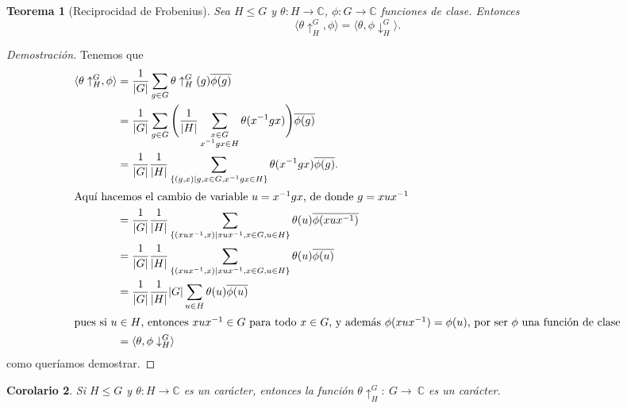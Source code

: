 \documentclass[12pt]{book}
\newtheorem{theorem}{Teorema}[section]
\newtheorem{corollary}[theorem]{Corolario}
\theoremstyle{definition}
\newcounter{in}
\begin{document}
\begin{theorem}[Reciprocidad de Frobenius]
  \label{frobenius}
  Sea $H\leq G$ y $\theta:H\rightarrow\mathbb{C}$,
  $\phi:G\rightarrow \mathbb{C}$ funciones de
  clase. Entonces
  \begin{equation*}
    \langle\theta\uparrow^{G}_{H},\phi\rangle=\langle\theta,\phi\downarrow^{G}_{H}\rangle.
  \end{equation*}
\end{theorem}
\begin{proof}[Demostración]
  Tenemos que 
  \begin{align*}
    \langle\theta\uparrow^{G}_{H},\phi\rangle&=\frac{1}{|G|}\sum_{g\in
      G}\theta\uparrow^{G}_{H}(g)\overline{\phi(g)}\\
    &=\frac{1}{|G|}\sum_{g\in G}\Bigg(\frac{1}{|H|}\sum_{\substack{x\in
        G\\x^{-1}gx\in H}}\theta(x^{-1}gx)\Bigg)\overline{\phi(g)}\\
    &=\frac{1}{|G|}\frac{1}{|H|}\sum_{\{(g,x)\mid g,x\in G,x^{-1}gx\in
      H\}}\theta(x^{-1}gx)\overline{\phi(g)}.\\
    \intertext{Aquí hacemos el cambio de variable $u=x^{-1}gx$, de donde $g=xux^{-1}$}
    &=\frac{1}{|G|}\frac{1}{|H|}\sum_{\{(xux^{-1},x)\mid xux^{-1},x\in
      G,u\in H\}}\theta(u)\overline{\phi(xux^{-1})}\\
    &=\frac{1}{|G|}\frac{1}{|H|}\sum_{\{(xux^{-1},x)\mid xux^{-1},x\in G,u\in H\}}\theta(u)\overline{\phi(u)}\\
    &=\frac{1}{|G|}\frac{1}{|H|}|G|\sum_{u\in
      H}\theta(u)\overline{\phi(u)}\\
    \intertext{pues si $u\in H$, entonces $xux^{-1}\in G$ para todo
    $x\in G$, y
      además $\phi(xux^{-1})=\phi(u)$, por ser $\phi$ una función de clase}
    &=\langle\theta,\phi\downarrow^{G}_{H}\rangle
  \end{align*}
  como queríamos demostrar.
\end{proof}

\begin{corollary}
  \label{car-inducido}
  Si $H\leq G$ y $\theta:H\rightarrow \mathbb{C}$ es un carácter,
  entonces la función $\theta\uparrow^{G}_{H}:~G\rightarrow~\mathbb{C}$ es un carácter.
\end{corollary}
\end{document}

